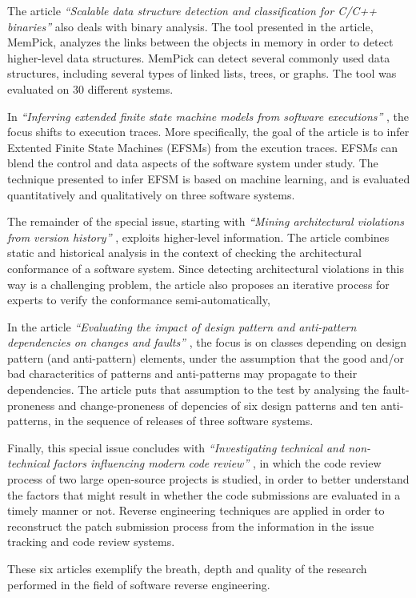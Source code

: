 \documentclass{svjour3}                     %
\begin{document}
The article \emph{``Scalable data structure detection and classification for C/C++ binaries''} \cite{structures} also deals with binary analysis. The tool presented in the article, MemPick, analyzes the links between the objects in memory in order to detect higher-level data structures. MemPick can detect several commonly used data structures, including several types of linked lists, trees, or graphs. The tool was evaluated on 30 different systems.

In \emph{``Inferring extended finite state machine models from software executions''} \cite{stateMachines}, the focus shifts to execution traces. More specifically, the goal of the article is to infer Extented Finite State Machines (EFSMs) from the excution traces. EFSMs can blend the control and data aspects of the software system under study. The technique presented to infer EFSM is based on machine learning, and is evaluated quantitatively and qualitatively on three software systems.

The remainder of the special issue, starting with \emph{``Mining architectural violations from version history''} \cite{architecture}, exploits higher-level information. The article combines static and historical analysis in the context of checking the architectural conformance of a software system. Since detecting architectural violations in this way is a challenging problem, the article also proposes an iterative process for experts to verify the conformance semi-automatically,

In the article \emph{``Evaluating the impact of design pattern and anti-pattern dependencies on changes and faults''} \cite{patterns}, the focus is on classes depending on design pattern (and anti-pattern) elements, under the assumption that the good and/or bad characteritics of patterns and anti-patterns may propagate to their dependencies. The article puts that assumption to the test by analysing the fault-proneness and change-proneness of depencies of six design patterns and ten anti-patterns, in the sequence of releases of three software systems.

Finally, this special issue concludes with \emph{``Investigating technical and non-technical factors influencing modern code review''} \cite{codeReview}, in which the code review process of two large open-source projects is studied, in order to better understand the factors that might result in whether the code submissions are evaluated in a timely manner or not. Reverse engineering techniques are applied in order to reconstruct the patch submission process from the information in the issue tracking and code review systems.

These six articles exemplify the breath, depth and quality of the research performed in the field of software reverse engineering.











\end{document}
